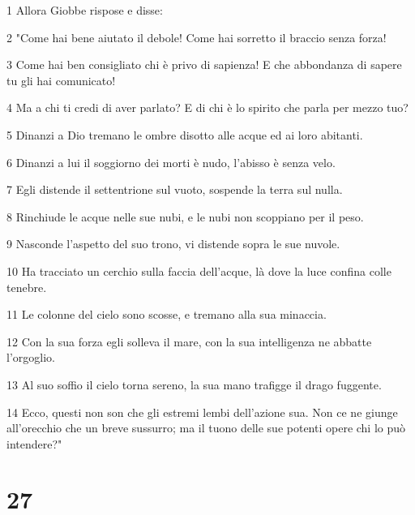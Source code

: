 \par 1 Allora Giobbe rispose e disse:
\par 2 "Come hai bene aiutato il debole! Come hai sorretto il braccio senza forza!
\par 3 Come hai ben consigliato chi è privo di sapienza! E che abbondanza di sapere tu gli hai comunicato!
\par 4 Ma a chi ti credi di aver parlato? E di chi è lo spirito che parla per mezzo tuo?
\par 5 Dinanzi a Dio tremano le ombre disotto alle acque ed ai loro abitanti.
\par 6 Dinanzi a lui il soggiorno dei morti è nudo, l'abisso è senza velo.
\par 7 Egli distende il settentrione sul vuoto, sospende la terra sul nulla.
\par 8 Rinchiude le acque nelle sue nubi, e le nubi non scoppiano per il peso.
\par 9 Nasconde l'aspetto del suo trono, vi distende sopra le sue nuvole.
\par 10 Ha tracciato un cerchio sulla faccia dell'acque, là dove la luce confina colle tenebre.
\par 11 Le colonne del cielo sono scosse, e tremano alla sua minaccia.
\par 12 Con la sua forza egli solleva il mare, con la sua intelligenza ne abbatte l'orgoglio.
\par 13 Al suo soffio il cielo torna sereno, la sua mano trafigge il drago fuggente.
\par 14 Ecco, questi non son che gli estremi lembi dell'azione sua. Non ce ne giunge all'orecchio che un breve sussurro; ma il tuono delle sue potenti opere chi lo può intendere?"

\chapter{27}

